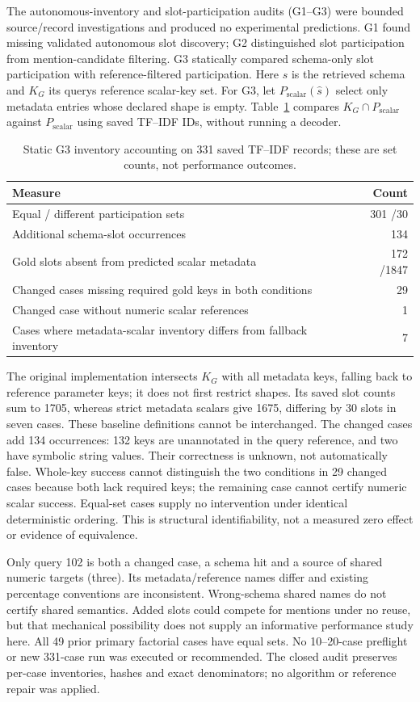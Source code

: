 The autonomous-inventory and slot-participation audits (G1--G3) were bounded source/record investigations and produced no experimental predictions. G1 found missing validated autonomous slot discovery; G2 distinguished slot participation from mention-candidate filtering. G3 statically compared schema-only slot participation with reference-filtered participation. Here $\hat{s}$ is the retrieved schema and $K_G$ its query\textquotesingle s reference scalar-key set. For G3, let $P_{\mathrm{scalar}}(\hat{s})$ select only metadata entries whose declared shape is empty. Table~\ref{tab:g3-inventory} compares $K_G\cap P_{\mathrm{scalar}}$ against $P_{\mathrm{scalar}}$ using saved TF--IDF IDs, without running a decoder.

\begin{table}[htbp]\centering\small
\caption{Static G3 inventory accounting on 331 saved TF--IDF records; these are set counts, not performance outcomes.}\label{tab:g3-inventory}
\begin{tabularx}{\linewidth}{@{}Xr@{}}\toprule
Measure & Count\\\midrule
Equal / different participation sets &301 /30\\
Additional schema-slot occurrences &134\\
Gold slots absent from predicted scalar metadata &172 /1847\\
Changed cases missing required gold keys in both conditions &29\\
Changed case without numeric scalar references &1\\
Cases where metadata-scalar inventory differs from fallback inventory &7\\\bottomrule
\end{tabularx}\end{table}

The original implementation intersects $K_G$ with all metadata keys, falling back to reference parameter keys; it does not first restrict shapes. Its saved slot counts sum to 1705, whereas strict metadata scalars give 1675, differing by 30 slots in seven cases. These baseline definitions cannot be interchanged. The changed cases add 134 occurrences: 132 keys are unannotated in the query reference, and two have symbolic string values. Their correctness is unknown, not automatically false. Whole-key success cannot distinguish the two conditions in 29 changed cases because both lack required keys; the remaining case cannot certify numeric scalar success. Equal-set cases supply no intervention under identical deterministic ordering. This is structural identifiability, not a measured zero effect or evidence of equivalence.

Only query 102 is both a changed case, a schema hit and a source of shared numeric targets (three). Its metadata/reference names differ and existing percentage conventions are inconsistent. Wrong-schema shared names do not certify shared semantics. Added slots could compete for mentions under no reuse, but that mechanical possibility does not supply an informative performance study here. All 49 prior primary factorial cases have equal sets. No 10--20-case preflight or new 331-case run was executed or recommended. The closed audit preserves per-case inventories, hashes and exact denominators; no algorithm or reference repair was applied.
